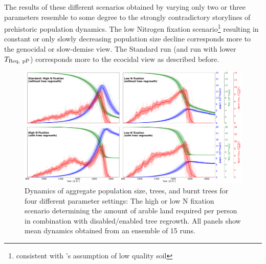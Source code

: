 The results of these different scenarios obtained by varying only two or three parameters resemble to some degree to the strongly contradictory storylines of prehistoric population dynamics.
The low Nitrogen fixation scenario\footnote{consistent with \citet{Hunt2007}'s assumption of low quality soil} resulting in constant or only slowly decreasing population size decline corresponds more to the genocidal \citep{Hunt2007} or slow-demise \citep{Brandt2015} view.
The Standard run (and run with lower $T_{\rm Req, \ pP}$) corresponds more to the ecocidal view as described before.



\begin{figure}
	\centering
	\includegraphics[width=1.3\textwidth, center]{images/Results/Standard/EnsembleStatistics_allTheories}
	\caption{Dynamics of aggregate population size, trees, and burnt trees for four different parameter settings: The high or low N fixation scenario determining the amount of arable land required per person in combination with disabled/enabled tree regrowth.
		All panels show mean dynamics obtained from an ensemble of 15 runs.}
	\label{fig:ensemblestatisticsalltheories}
\end{figure}

